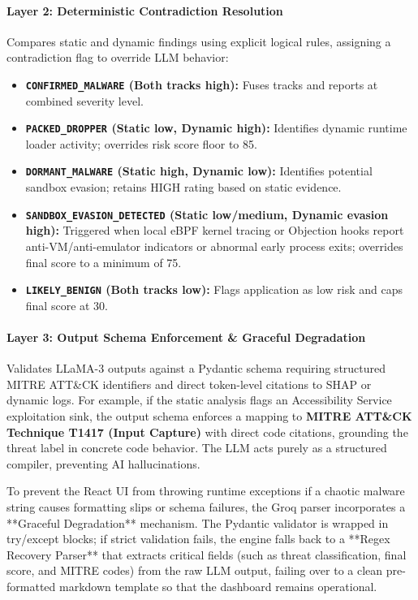 \documentclass[10pt,a4paper]{article}
\begin{document}
\paragraph{Layer 2: Deterministic Contradiction Resolution}
Compares static and dynamic findings using explicit logical rules, assigning a contradiction flag to override LLM behavior:
\begin{itemize}
  \item \textbf{\texttt{CONFIRMED\_MALWARE} (Both tracks high):} Fuses tracks and reports at combined severity level.
  \item \textbf{\texttt{PACKED\_DROPPER} (Static low, Dynamic high):} Identifies dynamic runtime loader activity; overrides risk score floor to 85.
  \item \textbf{\texttt{DORMANT\_MALWARE} (Static high, Dynamic low):} Identifies potential sandbox evasion; retains HIGH rating based on static evidence.
  \item \textbf{\texttt{SANDBOX\_EVASION\_DETECTED} (Static low/medium, Dynamic evasion high):} Triggered when local eBPF kernel tracing or Objection hooks report anti-VM/anti-emulator indicators or abnormal early process exits; overrides final score to a minimum of 75.
  \item \textbf{\texttt{LIKELY\_BENIGN} (Both tracks low):} Flags application as low risk and caps final score at 30.
\end{itemize}

\paragraph{Layer 3: Output Schema Enforcement \& Graceful Degradation}
Validates LLaMA-3 outputs against a Pydantic schema requiring structured MITRE ATT\&CK identifiers and direct token-level citations to SHAP or dynamic logs. For example, if the static analysis flags an Accessibility Service exploitation sink, the output schema enforces a mapping to \textbf{MITRE ATT\&CK Technique T1417 (Input Capture)} with direct code citations, grounding the threat label in concrete code behavior. The LLM acts purely as a structured compiler, preventing AI hallucinations.

To prevent the React UI from throwing runtime exceptions if a chaotic malware string causes formatting slips or schema failures, the Groq parser incorporates a **Graceful Degradation** mechanism. The Pydantic validator is wrapped in try/except blocks; if strict validation fails, the engine falls back to a **Regex Recovery Parser** that extracts critical fields (such as threat classification, final score, and MITRE codes) from the raw LLM output, failing over to a clean pre-formatted markdown template so that the dashboard remains operational.
\end{document}
